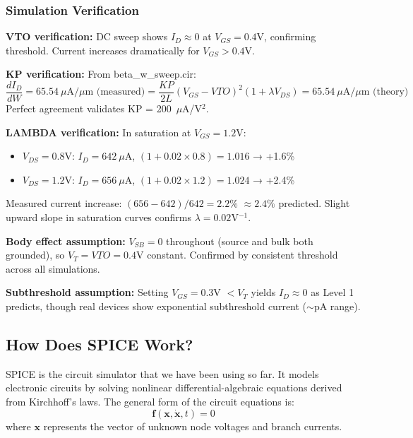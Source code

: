 \documentclass[a4paper,12pt]{article}
\begin{document}
\subsubsection{Simulation Verification}

\textbf{VTO verification:} DC sweep shows $I_D \approx 0$ at $V_{GS} = 0.4$V, confirming threshold. Current increases dramatically for $V_{GS} > 0.4$V.

\textbf{KP verification:} From beta\_w\_sweep.cir:
\begin{equation}
\frac{dI_D}{dW} = 65.54~\mu\text{A}/\mu\text{m (measured)} = \frac{KP}{2L}(V_{GS}-VTO)^2(1+\lambda V_{DS}) = 65.54~\mu\text{A}/\mu\text{m (theory)}
\end{equation}
Perfect agreement validates KP = 200~$\mu$A/V$^2$.

\textbf{LAMBDA verification:} In saturation at $V_{GS} = 1.2$V:
\begin{itemize}
    \item $V_{DS} = 0.8$V: $I_D = 642~\mu$A, $(1+0.02\times0.8) = 1.016$ → +1.6\%
    \item $V_{DS} = 1.2$V: $I_D = 656~\mu$A, $(1+0.02\times1.2) = 1.024$ → +2.4\%
\end{itemize}

Measured current increase: $(656-642)/642 = 2.2\%$ $\approx 2.4\%$ predicted. Slight upward slope in saturation curves confirms $\lambda = 0.02$V$^{-1}$.

\textbf{Body effect assumption:} $V_{SB} = 0$ throughout (source and bulk both grounded), so $V_T = VTO = 0.4$V constant. Confirmed by consistent threshold across all simulations.

\textbf{Subthreshold assumption:} Setting $V_{GS} = 0.3$V $< V_T$ yields $I_D \approx 0$ as Level 1 predicts, though real devices show exponential subthreshold current ($\sim$pA range).

\subsection{How Does SPICE Work?}

SPICE is the circuit simulator that we have been using so far. It models electronic circuits by solving nonlinear differential-algebraic equations derived from Kirchhoff’s laws. The general form of the circuit equations is:
\begin{equation}
\mathbf{f}(\mathbf{x}, \dot{\mathbf{x}}, t) = 0
\end{equation}
where \(\mathbf{x}\) represents the vector of unknown node voltages and branch currents.
\end{document}

